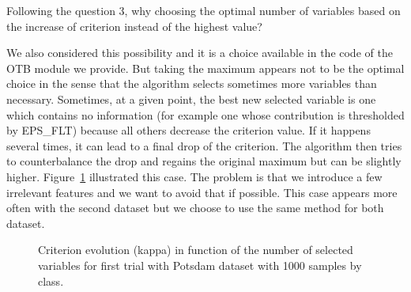 \documentclass[a4paper,10pt,DIV=16]{scrartcl}
\begin{document}
\begin{revbox}
  Following the question 3, why choosing the optimal number of variables based on the increase of criterion instead of the highest value?
  \begin{resbox}
    We also considered this possibility and it is a choice available in the code of the OTB module we provide. But taking the maximum appears not to be the optimal choice in the sense that the algorithm selects sometimes more variables than necessary. Sometimes, at a given point, the best new selected variable is one which contains no information (for example one whose contribution is thresholded by EPS\_FLT) because all others decrease the criterion value. If it happens several times, it can lead to a final drop of the criterion. The algorithm then tries to counterbalance the drop and regains the original maximum but can be slightly higher. Figure~\ref{fig:crit-evol} illustrated this case.
    The problem is that we introduce a few irrelevant features and we want to avoid that if possible. This case appears more often with the second dataset but we choose to use the same method for both dataset.
  \end{resbox}
\end{revbox}

\begin{figure}[!t]
  \centering
  \caption{Criterion evolution (kappa) in function of the number of selected variables for first trial with Potsdam dataset with 1000 samples by class.\label{fig:crit-evol}}
\end{figure}
\end{document}
